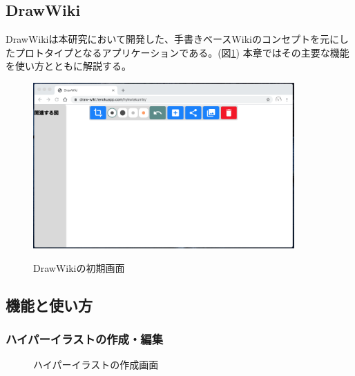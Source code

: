 \subsection{DrawWiki}
DrawWikiは本研究において開発した、手書きベースWikiのコンセプトを元にしたプロトタイプとなるアプリケーションである。(図\ref{drawwiki})
本章ではその主要な機能を使い方とともに解説する。

\begin{figure}[htbp]
    \begin{center}
    {\includegraphics[width=100mm]{images/initialdrawwiki.png}} \end{center}
    \caption{DrawWikiの初期画面}
    \label{drawwiki}
\end{figure}

\subsection{機能と使い方}

\subsubsection{ハイパーイラストの作成・編集}

\begin{figure}[htbp]
    \begin{center}
         \end{center}
    \caption{ハイパーイラストの作成画面}
    \label{hyperillustcreate}
\end{figure}

